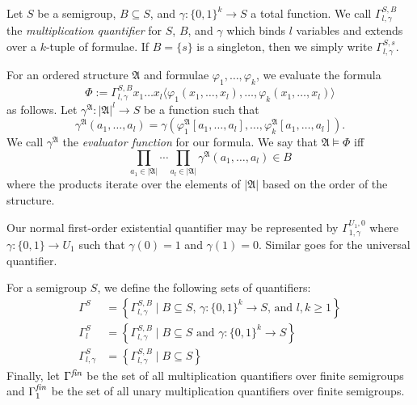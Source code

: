 \documentclass[a4paper,UKenglish,cleveref, autoref, thm-restate, anonymous]{lipics-v2021}
\begin{document}
\begin{definition}\label{def:multquant}
    Let $S$ be a semigroup, $B \subseteq S$, and $\gamma : \{0,1\}^k \rightarrow S$ a total function. We call $\Gamma_{l,\gamma}^{S,B}$ the \emph{multiplication quantifier} for $S$, $B$, and $\gamma$ which binds $l$ variables and extends over a $k$-tuple of formulae. If $B = \{s\}$ is a singleton, then we simply write $\Gamma_{l,\gamma}^{S,s}$.
    
    For an ordered structure $\mathfrak{A}$ and formulae $\varphi_1, \dots, \varphi_k$, we evaluate the formula \[
        \Phi := \Gamma_{l,\gamma}^{S,B}x_1\dots x_l\langle \varphi_1(x_1,\dots,x_l), \dots, \varphi_k(x_1,\dots,x_l)\rangle
    \] as follows. Let $\gamma^\mathfrak{A} : |\mathfrak{A}|^l \rightarrow S$ be a function such that \[
        \gamma^\mathfrak{A}(a_1,\dots,a_l) = \gamma(\varphi_1^\mathfrak{A}[a_1,\dots,a_l], \dots, \varphi_k^\mathfrak{A}[a_1,\dots,a_l]).
    \] We call $\gamma^\mathfrak{A}$ the \emph{evaluator function} for our formula. We say that \(\mathfrak{A} \models \Phi\) iff \[
        \prod_{a_1 \in |\mathfrak{A}|}\cdots\prod_{a_l \in |\mathfrak{A}|}\gamma^\mathfrak{A}(a_1,\dots,a_l) \in B
    \] where the products iterate over the elements of $|\mathfrak{A}|$ based on the order of the structure.
\end{definition}

\begin{example}
    Our normal first-order existential quantifier may be represented by $\Gamma^{U_1,0}_{1,\gamma}$ where $\gamma : \{0,1\} \rightarrow U_1$ such that $\gamma(0) = 1$ and $\gamma(1) = 0$. Similar goes for the universal quantifier.
\end{example}

\begin{definition}
    For a semigroup $S$, we define the following sets of quantifiers: 
    \begin{align*}
        \Gamma^S &= \left\{\Gamma^{S,B}_{l,\gamma} \mid B \subseteq S \text{, } \gamma : \{0,1\}^k \rightarrow S \text{, and } l,k \geq 1\right\}\\
        \Gamma^S_{l} &= \left\{\Gamma^{S,B}_{l,\gamma} \mid B \subseteq S \text{ and } \gamma : \{0,1\}^k \rightarrow S\right\}\\
        \Gamma^S_{l,\gamma} &= \left\{\Gamma^{S,B}_{l,\gamma} \mid B \subseteq S\right\}
    \end{align*}
    Finally, let $\Gamma^\emph{fin}$ be the set of all multiplication quantifiers over finite semigroups and $\Gamma^\emph{fin}_1$ be the set of all unary multiplication quantifiers over finite semigroups.
\end{definition}
\end{document}
